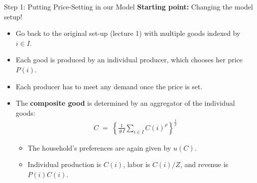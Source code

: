 \documentclass[10pt,c,aspectratio=1610,handout]{beamer}
\begin{document}
\begin{frame}{Step 1: Putting Price-Setting in our Model}%
  \textbf{Starting point:} Changing the model setup!%
  \begin{itemize}%
    \item[$\blacktriangleright$] Go back to the original set-up (lecture 1) with multiple goods indexed by $i\in I$.%
    \item[$\blacktriangleright$] Each good is produced by an individual producer, which chooses her price $P(i)$.%
    \item[$\blacktriangleright$] Each producer has to meet any demand once the price is set.%
    \pause%
    \item[$\blacktriangleright$] The \textbf{composite good} is determined by an aggregator of the individual goods:%
    \begin{align*}%
      C \; = \; \left\{ \frac{1}{\#I}\sum_{i\in I}C(i)^{\rho} \right\}^{\frac{1}{\rho}}%
    \end{align*}%
    \begin{itemize}%
      \item[$\rightarrow$] The household's preferences are again given by $u(C)$.%
      \item[$\rightarrow$] Individual production is $C(i)$, labor is $C(i)/Z$, and revenue is $P(i)C(i)$.%
    \end{itemize}%
  \end{itemize}%
\end{frame}%
\end{document}
